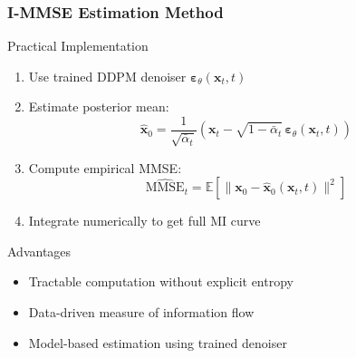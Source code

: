 \documentclass[aspectratio=169]{beamer}
\begin{document}
\begin{frame}
\frametitle{I-MMSE Estimation Method}
\begin{block}{Practical Implementation}
\begin{enumerate}
\item Use trained DDPM denoiser $\boldsymbol{\varepsilon}_\theta(\mathbf{x}_t, t)$
\item Estimate posterior mean:
\begin{equation}
\hat{\mathbf{x}}_0 = \frac{1}{\sqrt{\bar{\alpha}_t}}\left(\mathbf{x}_t - \sqrt{1-\bar{\alpha}_t}\,\boldsymbol{\varepsilon}_\theta(\mathbf{x}_t,t)\right)
\end{equation}
\item Compute empirical MMSE:
\begin{equation}
\widehat{\text{MMSE}}_t = \mathbb{E}[\|\mathbf{x}_0 - \hat{\mathbf{x}}_0(\mathbf{x}_t,t)\|^2]
\end{equation}
\item Integrate numerically to get full MI curve
\end{enumerate}
\end{block}

\begin{block}{Advantages}
\begin{itemize}
\item \textcolor{mygreen}{Tractable computation} without explicit entropy
\item \textcolor{mygreen}{Data-driven measure} of information flow
\item \textcolor{mygreen}{Model-based estimation} using trained denoiser
\end{itemize}
\end{block}
\end{frame}
\end{document}
